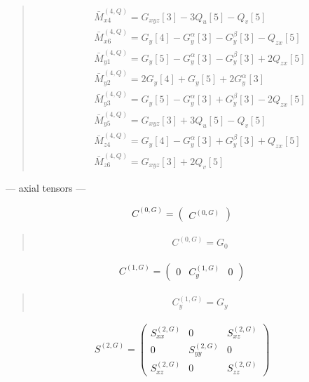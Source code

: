 \documentclass[fleqn,10pt]{jsarticle}
\begin{document}
\begin{quote}
\begin{align*}
& \bar{M}^{(4,Q)}_{x4} = G_{xyz}[3] - 3 Q_{u}[5] - Q_{v}[5] \\
& \bar{M}^{(4,Q)}_{x6} = G_{y}[4] - G_{y}^{\alpha}[3] - G_{y}^{\beta}[3] - Q_{zx}[5] \\
& \bar{M}^{(4,Q)}_{y1} = G_{y}[5] - G_{y}^{\alpha}[3] - G_{y}^{\beta}[3] + 2 Q_{zx}[5] \\
& \bar{M}^{(4,Q)}_{y2} = 2 G_{y}[4] + G_{y}[5] + 2 G_{y}^{\alpha}[3] \\
& \bar{M}^{(4,Q)}_{y3} = G_{y}[5] - G_{y}^{\alpha}[3] + G_{y}^{\beta}[3] - 2 Q_{zx}[5] \\
& \bar{M}^{(4,Q)}_{y5} = G_{xyz}[3] + 3 Q_{u}[5] - Q_{v}[5] \\
& \bar{M}^{(4,Q)}_{z4} = G_{y}[4] - G_{y}^{\alpha}[3] + G_{y}^{\beta}[3] + Q_{zx}[5] \\
& \bar{M}^{(4,Q)}_{z6} = G_{xyz}[3] + 2 Q_{v}[5]
\end{align*}
\end{quote}
\newpage
\begin{center}\LARGE --- axial tensors ---\end{center}
\begin{align*}
C^{(0,G)} = \begin{pmatrix} C^{(0,G)} \end{pmatrix}
\end{align*}
\begin{quote}
\begin{align*}
& C^{(0,G)} = G_{0}
\end{align*}
\end{quote}
\begin{align*}
C^{(1,G)} = \begin{pmatrix} 0 & C^{(1,G)}_{y} & 0 \end{pmatrix}
\end{align*}
\begin{quote}
\begin{align*}
& C^{(1,G)}_{y} = G_{y}
\end{align*}
\end{quote}
\begin{align*}
S^{(2,G)} = \begin{pmatrix} S^{(2,G)}_{xx} & 0 & S^{(2,G)}_{xz} \\ 0 & S^{(2,G)}_{yy} & 0 \\ S^{(2,G)}_{xz} & 0 & S^{(2,G)}_{zz} \end{pmatrix}
\end{align*}
\end{document}

